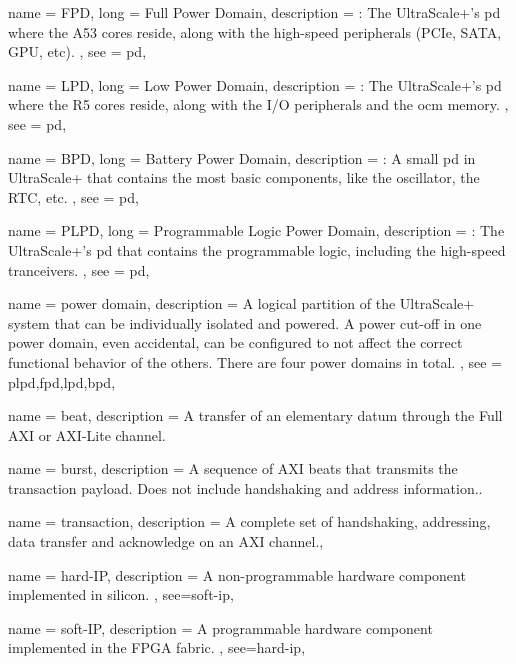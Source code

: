 {
	name = {FPD},
	long = {Full Power Domain},
	description = {\emph{}:
		The UltraScale+'s \gls{pd} where the A53 cores reside,
		along with the high-speed peripherals (PCIe, SATA, GPU, etc).
	},
	see = {pd},
}

{
	name = {LPD},
	long = {Low Power Domain},
	description = {\emph{}:
		The UltraScale+'s \gls{pd} where the R5 cores reside,
		along with the I/O peripherals and the \gls{ocm} memory.
	},
	see = {pd},
}

{
	name = {BPD},
	long = {Battery Power Domain},
	description = {\emph{}:
		A small \gls{pd} in UltraScale+ 
		that contains the most basic components,
		like the oscillator, the RTC, etc.
	},
	see = {pd},
}

{
	name = {PLPD},
	long = {Programmable Logic Power Domain},
	description = {\emph{}:
		The UltraScale+'s \gls{pd} that contains the
		programmable logic, including
		the high-speed tranceivers.
	},
	see = {pd},
}


{
	name = {power domain},
	description = {
		A logical partition of the UltraScale+ system that 
		can be individually isolated and powered.
		A power cut-off in one power domain, even accidental,
		can be configured to not affect the correct functional behavior
		of the others.
		There are four power domains in total.
	},
	see = {plpd,fpd,lpd,bpd},
}

{
	name = {beat},
	description = {A transfer of an elementary datum through the Full AXI or AXI-Lite channel.}
}

{
	name = {burst},
	description = {A sequence of AXI \Glspl{beat} that transmits the \gls{transaction} payload.
	Does not include handshaking and address information.}.
}

{
	name = {transaction},
	description = {A complete set of handshaking, addressing, data transfer and acknowledge on
	an AXI channel.},
}


{
	name = {hard-IP},
	description = {
		A non-programmable hardware component implemented in silicon.
	},
	see={soft-ip},
}

{
	name = {soft-IP},
	description = {
		A programmable hardware component implemented in the FPGA \gls{fabric}.
	},
	see={hard-ip},
}

